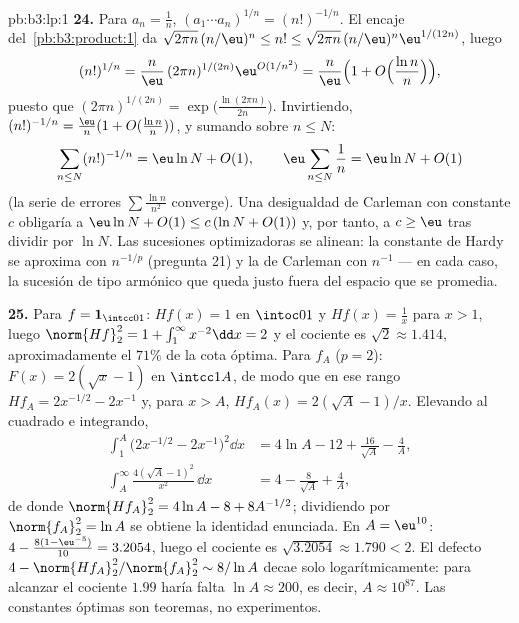 \begin{solution}{pb:b3:lp:1}
\textbf{24.} Para $a_n = \frac1n$, $(a_1\cdots a_n)^{1/n} =
(n!)^{-1/n}$. El encaje del~\cref{pb:b3:product:1} da
$\sqrt{2\pi n}\,(n/\eu)^n \leq n! \leq \sqrt{2\pi
n}\,(n/\eu)^n\eu^{1/(12n)}$, luego
\[
(n!)^{1/n} = \frac n\eu\,(2\pi n)^{1/(2n)}
\eu^{O(1/n^2)}
= \frac n\eu\Bigl(1 +
O\Bigl(\frac{\ln n}{n}\Bigr)\Bigr),
\]
puesto que $(2\pi n)^{1/(2n)} = \exp\bigl(\frac{\ln(2\pi
n)}{2n}\bigr)$. Invirtiendo, $(n!)^{-1/n} = \frac\eu n(1 +
O(\frac{\ln n}n))$, y sumando sobre $n \leq N$:
\[
\sum_{n\leq N}(n!)^{-1/n}
= \eu\ln N + O(1),
\qquad
\eu\sum_{n\leq N}\frac1n = \eu\ln N + O(1)
\]
(la serie de errores $\sum\frac{\ln n}{n^2}$ converge). Una desigualdad
de Carleman con constante $c$ obligaría a $\eu\ln N
+ O(1) \leq c\,(\ln N + O(1))$ y, por tanto, a $c \geq \eu$ tras dividir
por $\ln N$. Las sucesiones optimizadoras se alinean: la constante de
Hardy se aproxima con $n^{-1/p}$ (pregunta 21) y la de Carleman con
$n^{-1}$ --- en cada caso, la sucesión de tipo armónico que queda justo
fuera del espacio que se promedia.

\textbf{25.} Para $f = \mathbf 1_{\intcc01}$: $Hf(x) = 1$ en $\intoc01$
y $Hf(x) = \frac1x$ para $x > 1$, luego
$\norm{Hf}_2^2 = 1 + \int_1^\infty x^{-2}\dd x = 2$ y el cociente es
$\sqrt2 \approx 1.414$, aproximadamente el $71\%$ de la cota óptima.
Para $f_A$ ($p = 2$): $F(x) = 2(\sqrt x - 1)$ en $\intcc1A$, de modo que
en ese rango $Hf_A = 2x^{-1/2} - 2x^{-1}$ y, para $x > A$,
$Hf_A(x) = 2(\sqrt A - 1)/x$. Elevando al cuadrado e integrando,
\begin{align*}
\int_1^A\bigl(2x^{-1/2} - 2x^{-1}\bigr)^2\dd x
&= 4\ln A - 12 + \frac{16}{\sqrt A} - \frac4A,\\
\int_A^{\infty}\frac{4(\sqrt A - 1)^2}{x^2}\,\dd x
&= 4 - \frac{8}{\sqrt A} + \frac4A,
\end{align*}
de donde $\norm{Hf_A}_2^2 = 4\ln A - 8 + 8A^{-1/2}$; dividiendo por
$\norm{f_A}_2^2 = \ln A$ se obtiene la identidad enunciada. En $A
= \eu^{10}$: $4 - \frac{8(1 - \eu^{-5})}{10} = 3.2054$, luego el
cociente es $\sqrt{3.2054} \approx 1.790 < 2$. El defecto
$4 - \norm{Hf_A}_2^2/\norm{f_A}_2^2 \sim 8/\ln A$ decae solo
logarítmicamente: para alcanzar el cociente $1.99$ haría falta
$\ln A \approx 200$, es decir, $A \approx 10^{87}$. Las constantes
óptimas son teoremas, no experimentos.
\end{solution}

